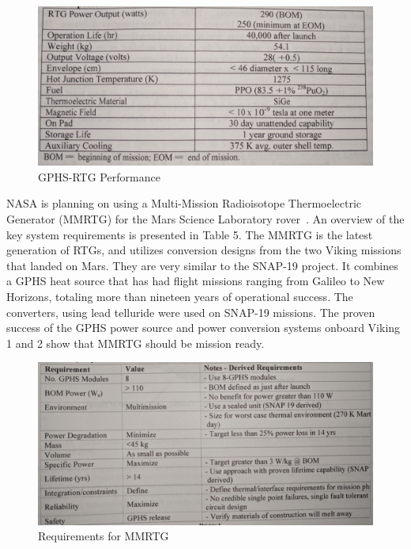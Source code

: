 \documentclass{article}
\begin{document}
\begin{figure}[]
	\centering
	\includegraphics[height=0.35\textheight]{fig/table4}
	\caption[GPHS-RTG Performance]{GPHS-RTG Performance~\cite{buden2011spacebook1}}
	\label{table4}
\end{figure}

NASA is planning on using a Multi-Mission Radioisotope Thermoelectric Generator
(MMRTG) for the Mars Science Laboratory rover~\cite{von2006mmrtg}. An overview of the key system requirements
is presented in Table 5. The MMRTG is the latest generation of RTGs, and utilizes conversion
designs from the two Viking missions that landed on Mars. They are very similar to the SNAP-19
project. It combines a GPHS heat source that has had flight missions ranging from Galileo to
New Horizons, totaling more than nineteen years of operational success. The converters, using
lead telluride were used on SNAP-19 missions. The proven success of the GPHS power source and power conversion systems onboard Viking 1 and 2 show that MMRTG should be mission ready.


\begin{figure}[]
	\centering
	\includegraphics[height=0.35\textheight]{fig/table5}
	\caption[Requirements for MMRTG]{Requirements for MMRTG~\cite{buden2011spacebook1}}
	\label{table5}
\end{figure}
\end{document}
